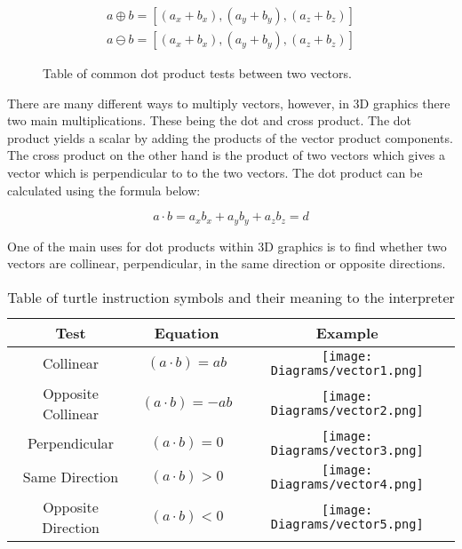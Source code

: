 \begin{equation}
\begin{aligned}
a \oplus b = [(a_x + b_x), (a_y + b_y), (a_z + b_z)]\\
a \ominus b = [(a_x + b_x), (a_y + b_y), (a_z + b_z)]
\end{aligned}
\end{equation}

\begin{figure}[htbp]
	{\centering
		\setlength{\fboxrule}{1pt}
		\vspace{7px}
		\caption{Table of common dot product tests between two vectors.}
	}
\end{figure}
\FloatBarrier

\noindent
There are many different ways to multiply vectors, however, in 3D graphics there two main multiplications. These being the dot and cross product. The dot product yields a scalar by adding the products of the vector product components. The cross product on the other hand is the product of two vectors which gives a vector which is perpendicular to to the two vectors. The dot product can be calculated using the formula below: 

\begin{equation}
a \cdot b = a_x b_x + a_y b_y + a_z b_z = d
\end{equation}

One of the main uses for dot products within 3D graphics is to find whether two vectors are collinear, perpendicular, in the same direction or opposite directions. 

\begin{table}[h!]
\centering
\begin{tabular}{ | c | c | c |}
\hline
	Test 	& Equation & Example\\  
\hline
\hline
	Collinear 							& $(a \cdot b) = ab$ & \texttt{[image: Diagrams/vector1.png]}\\
\hline
	Opposite Collinear 					& $(a \cdot b) = -ab$ &	\texttt{[image: Diagrams/vector2.png]}\\
\hline
	Perpendicular 						& $(a \cdot b) = 0$	&\texttt{[image: Diagrams/vector3.png]}\\
\hline
	Same Direction 						& $(a \cdot b) > 0$ &\texttt{[image: Diagrams/vector4.png]}\\
\hline
	Opposite Direction 					& $(a \cdot b) < 0$ &\texttt{[image: Diagrams/vector5.png]}\\
\hline

\end{tabular}
\caption{Table of turtle instruction symbols and their meaning to the interpreter}
\label{instruction table 1}
\end{table}
\FloatBarrier

